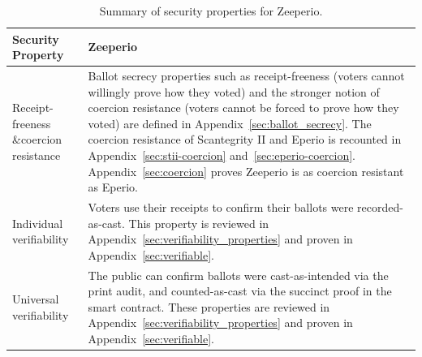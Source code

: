 
\begin{table}[t]
\centering
\small
\renewcommand{\arraystretch}{1.3}
\begin{tabular}{p{3cm}@{\hspace{0.2cm}}p{8.7cm}}
\toprule

Security Property & Zeeperio \\
\midrule
Receipt-freeness \&\newline coercion resistance &
Ballot secrecy properties such as receipt-freeness (voters cannot willingly prove how they voted) and the stronger notion of coercion resistance (voters cannot be forced to prove how they voted) are defined in Appendix~\ref{sec:ballot_secrecy}. The coercion resistance of Scantegrity II and Eperio is recounted in Appendix~\ref{sec:stii-coercion} and~\ref{sec:eperio-coercion}. Appendix~\ref{sec:coercion} proves Zeeperio is as coercion resistant as Eperio.\\

Individual \newline verifiability &

Voters use their receipts to confirm their ballots were recorded-as-cast. This property is reviewed in Appendix~\ref{sec:verifiability_properties} and proven in Appendix~\ref{sec:verifiable}.\\

Universal \newline verifiability &
The public can confirm ballots were cast-as-intended via the print audit, and counted-as-cast via the succinct proof in the smart contract. These properties are reviewed in Appendix~\ref{sec:verifiability_properties} and proven in Appendix~\ref{sec:verifiable}.\\
\bottomrule
\end{tabular}
\caption{Summary of security properties for Zeeperio.}
\label{tab:properties}
\end{table}